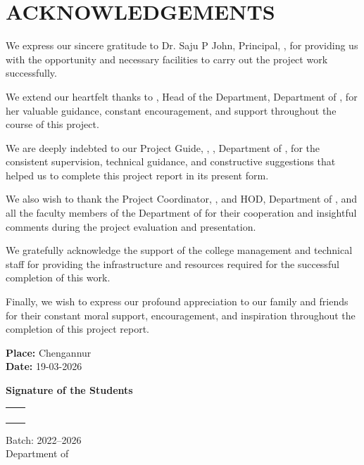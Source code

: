 \chapter*{ACKNOWLEDGEMENTS}

We express our sincere gratitude to  Dr. Saju P John, Principal, \thecollege, for providing us with the opportunity and necessary facilities to carry out the project work successfully.

We extend our heartfelt thanks to \thehod, Head of the Department, Department of \thedepartment, for her valuable guidance, constant encouragement, and support throughout the course of this project.

We are deeply indebted to our Project Guide, \theprojectguide, \projectguidedesignation, Department of \thedepartment, for the consistent supervision, technical guidance, and constructive suggestions that helped us to complete this project report in its present form.

We also wish to thank the Project Coordinator, \theProjectcoordinator, \ProjectcoordinatorDesignation and HOD, Department of \thedepartment, and all the faculty members of the Department of \thedepartment for their cooperation and insightful comments during the project evaluation and presentation.

We gratefully acknowledge the support of the college management and technical staff for providing the infrastructure and resources required for the successful completion of this work.

Finally, we wish to express our profound appreciation to our family and friends for their constant moral support, encouragement, and inspiration throughout the completion of this project report.

\textbf{Place:} Chengannur\\
\textbf{Date:} 19-03-2026\\
\vspace{0.1cm}

\textbf{Signature of the Students}

\begin{tabular}{l r}
	\fontsize{12pt}{12pt}\selectfont\textbf{\studentA} & \regA \\
	\fontsize{12pt}{12pt}\selectfont\textbf{\studentB} & \regB \\
	\fontsize{12pt}{12pt}\selectfont\textbf{\studentC} & \regC \\
	\fontsize{12pt}{12pt}\selectfont\textbf{\studentD} & \regD \\
\end{tabular}


\vspace{0.2cm}

Batch: 2022--2026\\
Department of \thedepartment\\
\thecollege
